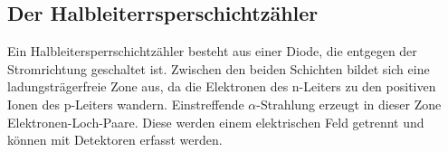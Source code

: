 \subsection{Der Halbleiterrsperschichtzähler}
Ein Halbleitersperrschichtzähler besteht aus einer Diode, die entgegen der Stromrichtung geschaltet ist.
Zwischen den beiden Schichten bildet sich eine ladungsträgerfreie Zone aus, da die Elektronen des n-Leiters zu den positiven Ionen des p-Leiters wandern.
Einstreffende $\alpha$-Strahlung erzeugt in dieser Zone Elektronen-Loch-Paare.
Diese werden einem elektrischen Feld getrennt und können mit Detektoren erfasst werden.
